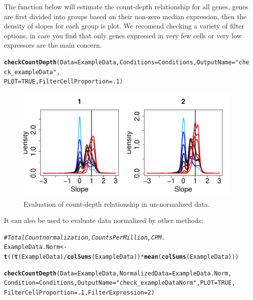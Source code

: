 \documentclass{article}\usepackage[]{graphicx}\usepackage[usenames,dvipsnames]{color}
\makeatletter
\newcommand{\hlnum}[1]{\textcolor[rgb]{0.686,0.059,0.569}{#1}}%
\newcommand{\hlstr}[1]{\textcolor[rgb]{0.192,0.494,0.8}{#1}}%
\newcommand{\hlcom}[1]{\textcolor[rgb]{0.678,0.584,0.686}{\textit{#1}}}%
\newcommand{\hlopt}[1]{\textcolor[rgb]{0,0,0}{#1}}%
\newcommand{\hlstd}[1]{\textcolor[rgb]{0.345,0.345,0.345}{#1}}%
\newcommand{\hlkwb}[1]{\textcolor[rgb]{0.69,0.353,0.396}{#1}}%
\newcommand{\hlkwc}[1]{\textcolor[rgb]{0.333,0.667,0.333}{#1}}%
\newcommand{\hlkwd}[1]{\textcolor[rgb]{0.737,0.353,0.396}{\textbf{#1}}}%
\newenvironment{kframe}{%
 \def\at@end@of@kframe{}%
 \ifinner\ifhmode%
  \def\at@end@of@kframe{\end{minipage}}%
  \begin{minipage}{\columnwidth}%
 \fi\fi%
 \def\FrameCommand##1{\hskip\@totalleftmargin \hskip-\fboxsep
 \colorbox{shadecolor}{##1}\hskip-\fboxsep
     \hskip-\linewidth \hskip-\@totalleftmargin \hskip\columnwidth}%
 \MakeFramed {\advance\hsize-\width
   \@totalleftmargin\z@ \linewidth\hsize
   \@setminipage}}%
 {\par\unskip\endMakeFramed%
 \at@end@of@kframe}
\newenvironment{knitrout}{}{} %
\makeatother
\begin{document}
The function below will estimate the count-depth relationship for all genes, genes are first divided into groups based on their non-zero median expression, then the density of slopes for each group is plot. We recomend checking a variety of filter options, in case you find that only genes expressed in very few cells or very low expressors are the main concern.
\begin{knitrout}
\color{fgcolor}\begin{kframe}
\begin{alltt}
\hlkwd{checkCountDepth}\hlstd{(}\hlkwc{Data} \hlstd{= ExampleData,} \hlkwc{Conditions} \hlstd{= Conditions,} \hlkwc{OutputName} \hlstd{=} \hlstr{"check_exampleData"}\hlstd{,}
                \hlkwc{PLOT}\hlstd{=}\hlnum{TRUE}\hlstd{,} \hlkwc{FilterCellProportion} \hlstd{=} \hlnum{.1}\hlstd{)}
\end{alltt}
\end{kframe}
\end{knitrout}
  
\begin{figure}[h!]
\centering
\includegraphics[width=.7\textwidth]{check_exampleData_initial_evaluation.pdf}
\caption{Evaluation of count-depth relationship in un-normalized data.}
\end{figure}

\newpage
It can also be used to evaluate data normalized by other methods:
\begin{knitrout}
\color{fgcolor}\begin{kframe}
\begin{alltt}
\hlcom{# Total Count normalization, Counts Per Million, CPM. }
\hlstd{ExampleData.Norm} \hlkwb{<-} \hlkwd{t}\hlstd{((}\hlkwd{t}\hlstd{(ExampleData)} \hlopt{/} \hlkwd{colSums}\hlstd{(ExampleData))} \hlopt{*} \hlkwd{mean}\hlstd{(}\hlkwd{colSums}\hlstd{(ExampleData)))}

\hlkwd{checkCountDepth}\hlstd{(}\hlkwc{Data} \hlstd{= ExampleData,} \hlkwc{NormalizedData} \hlstd{= ExampleData.Norm,}
                \hlkwc{Condition} \hlstd{= Conditions,} \hlkwc{OutputName} \hlstd{=} \hlstr{"check_exampleDataNorm"}\hlstd{,} \hlkwc{PLOT}\hlstd{=}\hlnum{TRUE}\hlstd{,}
                \hlkwc{FilterCellProportion} \hlstd{=} \hlnum{.1}\hlstd{,} \hlkwc{FilterExpression} \hlstd{=} \hlnum{2}\hlstd{)}
\end{alltt}
\end{kframe}
\end{knitrout}
\end{document}
